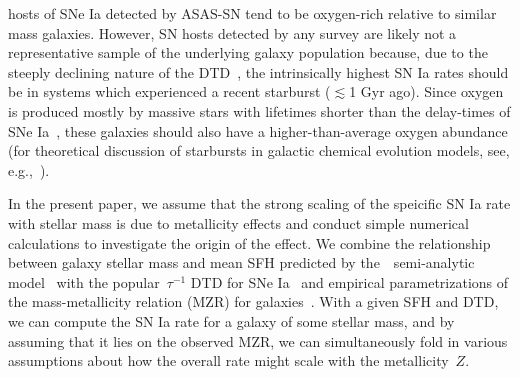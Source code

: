 \documentclass[ms.tex]{subfiles}
\begin{document}
hosts of SNe Ia detected by ASAS-SN tend to be oxygen-rich relative to similar
mass galaxies.
However, SN hosts detected by any survey are likely not a representative sample
of the underlying galaxy population because, due to the steeply declining
nature of the DTD~\citep[e.g.][]{Maoz2012a}, the intrinsically highest SN Ia
rates should be in systems which experienced a recent starburst ($\lesssim$1
Gyr ago).
Since oxygen is produced mostly by massive stars with lifetimes shorter than
the delay-times of SNe Ia~\citep*[e.g.][]{Hurley2000, Johnson2019}, these
galaxies should also have a higher-than-average oxygen abundance (for
theoretical discussion of starbursts in galactic chemical evolution models,
see, e.g.,~\citealt{Johnson2020}).
\par
In the present paper, we assume that the strong scaling of the speicific SN Ia
rate with stellar mass is due to metallicity effects and conduct simple
numerical calculations to investigate the origin of the effect.
We combine the relationship between galaxy stellar mass and mean SFH predicted
by the~\um~semi-analytic model~\citep{Behroozi2019} with the popular~$\tau^{-1}$
DTD for SNe Ia~\citep[e.g.][]{Maoz2012a} and empirical parametrizations of the
mass-metallicity relation (MZR) for galaxies~\citep{Andrews2013, Zahid2014}.
With a given SFH and DTD, we can compute the SN Ia rate for a galaxy of some
stellar mass, and by assuming that it lies on the observed MZR, we can
simultaneously fold in various assumptions about how the overall rate might
scale with the metallicity~$Z$.
\end{document}
